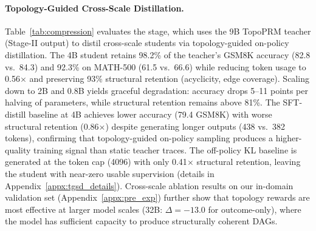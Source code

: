 \paragraph{Topology-Guided Cross-Scale Distillation.}
Table~\ref{tab:compression} evaluates the \framework stage, which uses the 9B TopoPRM teacher (Stage-II output) to distil cross-scale students via topology-guided on-policy distillation.
The 4B student retains 98.2\% of the teacher's GSM8K accuracy (82.8 vs.\ 84.3) and 92.3\% on MATH-500 (61.5 vs.\ 66.6) while reducing token usage to 0.56$\times$ and preserving 93\% structural retention (acyclicity, edge coverage).
Scaling down to 2B and 0.8B yields graceful degradation: accuracy drops 5--11 points per halving of parameters, while structural retention remains above 81\%.
The SFT-distill baseline at 4B achieves lower accuracy (79.4 GSM8K) with worse structural retention (0.86$\times$) despite generating longer outputs (438 vs.\ 382 tokens), confirming that topology-guided on-policy sampling produces a higher-quality training signal than static teacher traces.
The off-policy KL baseline is generated at the token cap (4096) with only 0.41$\times$ structural retention, leaving the student with near-zero usable supervision (details in Appendix~\ref{appx:tgsd_details}).
Cross-scale ablation results on our in-domain validation set (Appendix~\ref{appx:pre_exp}) further show that topology rewards are most effective at larger model scales (32B: $\Delta{=}{-}13.0$ for outcome-only), where the model has sufficient capacity to produce structurally coherent DAGs.
